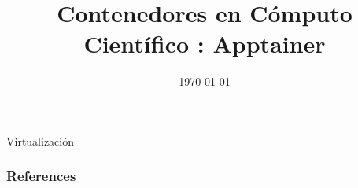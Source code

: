 \documentclass[11pt]{beamer}
\title[]{Contenedores en Cómputo Científico : Apptainer}
\institute[ITESM]{Data Pub\\ ITESM}
\date{\today}
\begin{document}
\begin{frame}
\titlepage
\end{frame}


\begin{frame}{Virtualización}

\end{frame}


\begin{frame}[allowframebreaks]
        \frametitle{References}
		

       
\end{frame}
\end{document}
